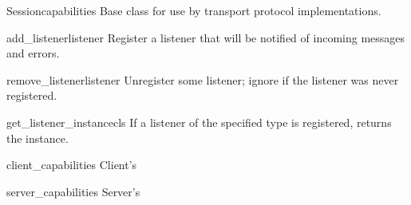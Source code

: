 \documentclass[a4paper,10pt,english]{manual}
\begin{document}
\hypertarget{ncclient.transport.Session}{}\begin{classdesc}{Session}{capabilities}
Base class for use by transport protocol implementations.

\hypertarget{ncclient.transport.Session.add_listener}{}\begin{methoddesc}{add\_listener}{listener}
Register a listener that will be notified of incoming messages and
errors.
\begin{quote}\begin{description}
\end{description}\end{quote}
\end{methoddesc}

\hypertarget{ncclient.transport.Session.remove_listener}{}\begin{methoddesc}{remove\_listener}{listener}
Unregister some listener; ignore if the listener was never
registered.
\begin{quote}\begin{description}
\end{description}\end{quote}
\end{methoddesc}

\hypertarget{ncclient.transport.Session.get_listener_instance}{}\begin{methoddesc}{get\_listener\_instance}{cls}
If a listener of the specified type is registered, returns the
instance.
\begin{quote}\begin{description}
\end{description}\end{quote}
\end{methoddesc}

\hypertarget{ncclient.transport.Session.client_capabilities}{}\begin{memberdesc}{client\_capabilities}
Client's 
\end{memberdesc}

\hypertarget{ncclient.transport.Session.server_capabilities}{}\begin{memberdesc}{server\_capabilities}
Server's 
\end{memberdesc}


\end{classdesc}
\end{document}
